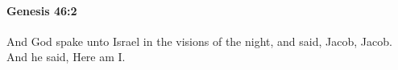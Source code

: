 
		\paragraph{Genesis 46:2} %
			\label{GENESIS-46-2}

			And God spake unto Israel in the visions of the night, and said, Jacob, Jacob. And he said, Here am I.


